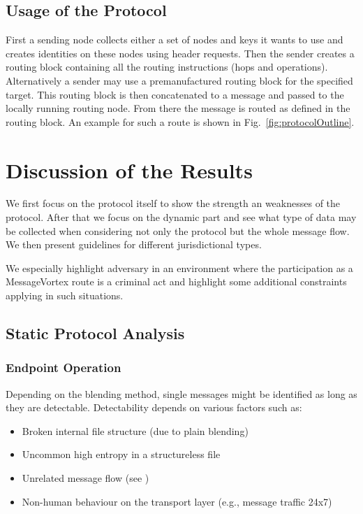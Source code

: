 \documentclass[10pt,journal,compsoc]{IEEEtran}
\begin{document}
\subsection{Usage of the Protocol}
First a sending node collects either a set of nodes and keys it wants to use and creates identities on these nodes using header requests. Then the sender creates a routing block containing all the routing instructions (hops and operations). Alternatively a sender may use a premanufactured routing block for the specified target. This routing block is then concatenated to a message and passed to the locally running routing node. From there the message is routed as defined in the routing block. An example for such a route is shown in Fig.~\ref{fig:protocolOutline}.

\section{Discussion of the Results}
We first focus on the protocol itself to show the strength an weaknesses of the protocol. After that we focus on the dynamic part and see what type of data may be collected when considering not only the protocol but the whole message flow. We then present guidelines for different jurisdictional types.

We especially highlight adversary in an environment where the participation as a MessageVortex route is a criminal act and highlight some additional constraints applying in such situations.

\subsection{Static Protocol Analysis\label{sec:staticAnalysis}}
\subsubsection{Endpoint Operation}
Depending on the blending method, single messages might be identified as long as they are detectable. Detectability depends on various factors such as:

\begin{itemize}
	\item Broken internal file structure (due to plain blending)
	\item Uncommon high entropy in a structureless file
	\item Unrelated message flow (see \cite{oakland2013-parrot})
	\item Non-human behaviour on the transport layer (e.g., message traffic 24x7)
\end{itemize}
\end{document}
